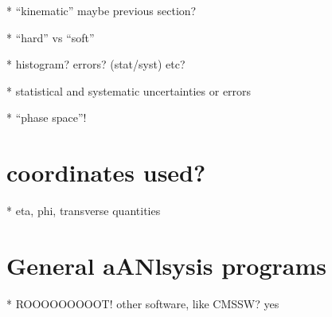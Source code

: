    * ``kinematic'' maybe previous section?

   * ``hard'' vs ``soft''

   * histogram?  errors? (stat/syst) etc?

   * statistical and systematic uncertainties or errors

   * ``phase space''!

\section{coordinates used?}

   * eta, phi, transverse quantities

\section{General aANlsysis programs}

   * ROOOOOOOOOT!  other software, like CMSSW? yes

